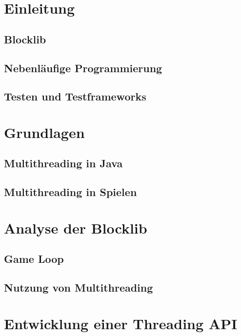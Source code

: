 \documentclass[12pt,a4paper,listof=totocnumbered,parskip=half]{scrreprt}
\begin{document}

\null\thispagestyle{empty}\clearpage
\tableofcontents
\chapter{Einleitung}
\section{Blocklib}
\section{Nebenläufige Programmierung}
\section{Testen und Testframeworks}

\chapter{Grundlagen}


\section{Multithreading in Java}
\section{Multithreading in Spielen}


\chapter{Analyse der Blocklib}

\section{Game Loop}

\section{Nutzung von Multithreading}



\chapter{Entwicklung einer Threading API}
\end{document}

